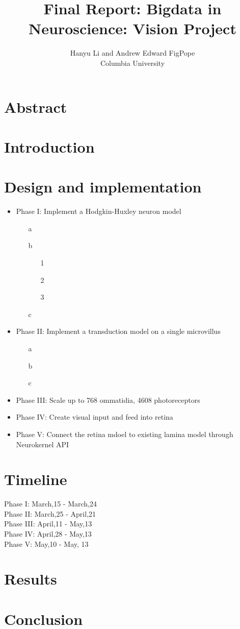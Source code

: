 \documentclass[12pt]{article}
\title{Final Report: Bigdata in Neuroscience: Vision Project\\
}
\author{Hanyu Li and Andrew Edward FigPope\\
Columbia University
}
\begin{document}
\maketitle


\section{Abstract}
\section{Introduction}
\section{Design and implementation}
\begin{itemize}
\item Phase I: 
Implement a Hodgkin-Huxley neuron model
  \begin{itemize}
	\item[a] 
    \item[b] 
        \begin{itemize}
        \item[1] 
        \item[2] 
        \item[3]
        \end{itemize}
        
    \item[c] 

  \end{itemize}
\item Phase II:
Implement a transduction model on a single microvillus
    \begin{itemize}
    \item[a] 
    \item[b] 
    \item[c]
    \end{itemize}
\item Phase III: Scale up to 768 ommatidia, 4608 photoreceptors 
\item Phase IV: Create visual input and feed into retina
\item Phase V: Connect the retina mdoel to existing lamina model through Neurokernel API
\end{itemize}
\section{Timeline}
    Phase I: March,15 - March,24\\
    Phase II: March,25 - April,21\\
    Phase III: April,11 - May,13\\
    Phase IV: April,28 - May,13\\
    Phase V: May,10 - May, 13\\
\section{Results}
\section{Conclusion}
\end{document}
